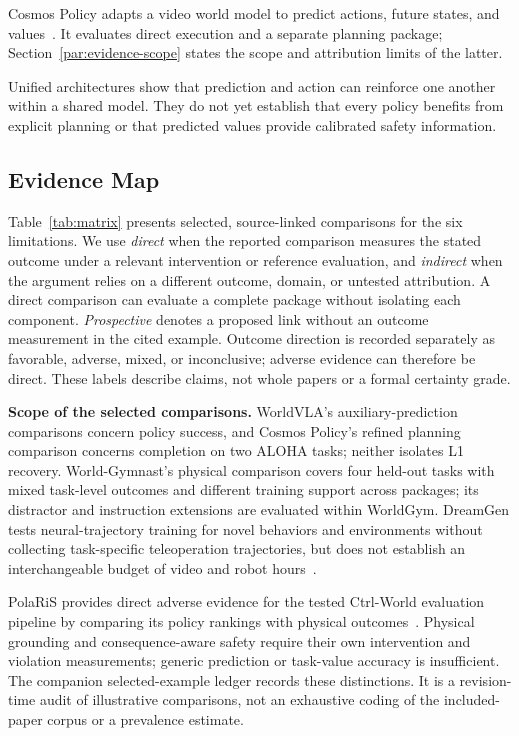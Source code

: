 \documentclass{ieeeaccess}
\begin{document}
\textcolor[RGB]{104,48,148}{Cosmos Policy adapts a video world model to predict actions, future states, and values~\cite{cosmospolicy}. It evaluates direct execution and a separate planning package; Section~\ref{par:evidence-scope} states the scope and attribution limits of the latter.}

Unified architectures show that prediction and action can reinforce one another within a shared model. They do not yet establish that every policy benefits from explicit planning or that predicted values provide calibrated safety information.


\subsection{Evidence Map}
\label{sec:evidence-map}
\textcolor[RGB]{104,48,148}{Table~\ref{tab:matrix} presents selected, source-linked comparisons for the six limitations. We use \emph{direct} when the reported comparison measures the stated outcome under a relevant intervention or reference evaluation, and \emph{indirect} when the argument relies on a different outcome, domain, or untested attribution. A direct comparison can evaluate a complete package without isolating each component. \emph{Prospective} denotes a proposed link without an outcome measurement in the cited example. Outcome direction is recorded separately as favorable, adverse, mixed, or inconclusive; adverse evidence can therefore be direct. These labels describe claims, not whole papers or a formal certainty grade.}

\textcolor[RGB]{104,48,148}{\noindent\textbf{Scope of the selected comparisons.}\label{par:evidence-scope}
WorldVLA's auxiliary-prediction comparisons concern policy success, and Cosmos Policy's refined planning comparison concerns completion on two ALOHA tasks; neither isolates L1 recovery. World-Gymnast's physical comparison covers four held-out tasks with mixed task-level outcomes and different training support across packages; its distractor and instruction extensions are evaluated within WorldGym. DreamGen tests neural-trajectory training for novel behaviors and environments without collecting task-specific teleoperation trajectories, but does not establish an interchangeable budget of video and robot hours~\cite{worldvla,cosmospolicy,sharma2026worldgymnast,dreamgen}.}

\textcolor[RGB]{104,48,148}{PolaRiS provides direct adverse evidence for the tested Ctrl-World evaluation pipeline by comparing its policy rankings with physical outcomes~\cite{polaris}. Physical grounding and consequence-aware safety require their own intervention and violation measurements; generic prediction or task-value accuracy is insufficient. The companion selected-example ledger records these distinctions. It is a revision-time audit of illustrative comparisons, not an exhaustive coding of the included-paper corpus or a prevalence estimate.}
\end{document}
